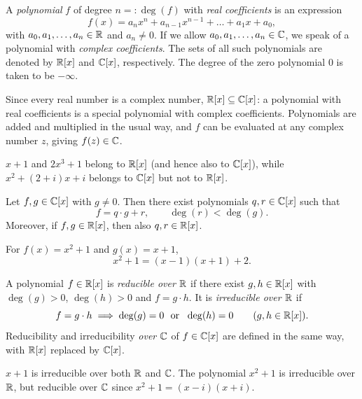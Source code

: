 \begin{definition}
A \emph{polynomial} $f$ of degree $n=:\deg(f)$ with \emph{real coefficients} is an expression
\[
f(x) = a_n x^n + a_{n-1}x^{n-1}+\ldots + a_1 x + a_0,
\]
with $a_0,a_1,\ldots,a_n\in \mathbb{R}$ and $a_n\neq 0$. If we allow $a_0,a_1,\ldots,a_n\in\mathbb{C}$, we speak of a
polynomial with \emph{complex coefficients}. The sets of all such polynomials are denoted by $\mathbb{R}[x]$ and
$\mathbb{C}[x]$, respectively. The degree of the zero polynomial $0$ is taken to be $-\infty$.
\end{definition}

\noindent Since every real number is a complex number, $\mathbb{R}[x]\subseteq\mathbb{C}[x]$: a polynomial with real
coefficients is a special polynomial with complex coefficients. Polynomials are added and multiplied in the
usual way, and $f$ can be evaluated at any complex number $z$, giving $f(z)\in\mathbb{C}$.

\begin{example}
$x+1$ and $2x^3+1$ belong to $\mathbb{R}[x]$ (and hence also to $\mathbb{C}[x]$), while $x^2+(2+i)x+i$ belongs to $\mathbb{C}[x]$
but not to $\mathbb{R}[x]$.
\end{example}

\begin{fact}
Let $f,g\in\mathbb{C}[x]$ with $g\neq 0$. Then there exist polynomials $q,r\in \mathbb{C}[x]$ such that
\[
f = q\cdot g + r, \qquad \deg(r)<\deg(g).
\]
Moreover, if $f,g\in\mathbb{R}[x]$, then also $q,r\in\mathbb{R}[x]$.
\end{fact}

\begin{example}
For $f(x) = x^2+1$ and $g(x) = x+1$,
\[
x^2+1 = (x-1)(x+1)+2.
\]
\end{example}

\begin{definition}
A polynomial $f\in \mathbb{R}[x]$ is \emph{reducible over $\mathbb{R}$} if there exist $g,h\in \mathbb{R}[x]$ with $\deg(g)>0$,
$\deg(h)>0$ and $f=g\cdot h$. It is \emph{irreducible over $\mathbb{R}$} if
\[
f = g\cdot h \implies \deg(g)=0 \ \text{ or } \ \deg(h)=0 \qquad (g,h\in\mathbb{R}[x]).
\]
Reducibility and irreducibility \emph{over $\mathbb{C}$} of $f\in\mathbb{C}[x]$ are defined in the same way, with $\mathbb{R}[x]$
replaced by $\mathbb{C}[x]$.
\end{definition}

\begin{example}
$x+1$ is irreducible over both $\mathbb{R}$ and $\mathbb{C}$. The polynomial $x^2+1$ is irreducible over $\mathbb{R}$, but reducible
over $\mathbb{C}$ since $x^2+1 = (x-i)(x+i)$.
\end{example}

